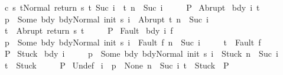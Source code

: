 \begin{isabellebody}
\ \ \ \ \ {\isasymGamma}{\isasymturnstile}{\isasymlangle}c\ s\ t{\isacharprime}{\isacharcomma}Normal\ {\isacharparenleft}return\ s\ t{\isacharprime}{\isacharparenright}{\isasymrangle}\ {\isacharequal}Suc\ i{\isasymRightarrow}\ \ t{\isacharsemicolon}\ n\ {\isacharequal}\ Suc\ i{\isasymrbrakk}\isanewline
\ \ \ \ {\isasymLongrightarrow}\ P{\isachardoublequoteclose}\isanewline
{}\ Abrupt{\isacharcolon}\isanewline
\ {\isachardoublequoteopen}{\isasymAnd}bdy\ i\ t{\isacharprime}{\isachardot}\isanewline
\ \ \ \ {\isasymlbrakk}{\isasymGamma}\ p\ {\isacharequal}\ Some\ bdy{\isacharsemicolon}\ {\isasymGamma}{\isasymturnstile}{\isasymlangle}bdy{\isacharcomma}Normal\ {\isacharparenleft}init\ s{\isacharparenright}{\isasymrangle}\ {\isacharequal}i{\isasymRightarrow}\ \ Abrupt\ t{\isacharprime}{\isacharsemicolon}\ n\ {\isacharequal}\ Suc\ i{\isacharsemicolon}\isanewline
\ \ \ \ \ t\ {\isacharequal}\ Abrupt\ {\isacharparenleft}return\ s\ t{\isacharprime}{\isacharparenright}{\isasymrbrakk}\isanewline
\ \ \ \ {\isasymLongrightarrow}\ P{\isachardoublequoteclose}\isanewline
{}\ Fault{\isacharcolon}\isanewline
\ {\isachardoublequoteopen}{\isasymAnd}bdy\ i\ f{\isachardot}\isanewline
\ \ \ \ {\isasymlbrakk}{\isasymGamma}\ p\ {\isacharequal}\ Some\ bdy{\isacharsemicolon}\ {\isasymGamma}{\isasymturnstile}{\isasymlangle}bdy{\isacharcomma}Normal\ {\isacharparenleft}init\ s{\isacharparenright}{\isasymrangle}\ {\isacharequal}i{\isasymRightarrow}\ \ Fault\ f{\isacharsemicolon}\ n\ {\isacharequal}\ Suc\ i{\isacharsemicolon}\isanewline
\ \ \ \ \ t\ {\isacharequal}\ Fault\ f{\isasymrbrakk}\isanewline
\ \ \ \ {\isasymLongrightarrow}\ P{\isachardoublequoteclose}\isanewline
{}\ Stuck{\isacharcolon}\isanewline
\ {\isachardoublequoteopen}{\isasymAnd}bdy\ i{\isachardot}\isanewline
\ \ \ \ {\isasymlbrakk}{\isasymGamma}\ p\ {\isacharequal}\ Some\ bdy{\isacharsemicolon}\ {\isasymGamma}{\isasymturnstile}{\isasymlangle}bdy{\isacharcomma}Normal\ {\isacharparenleft}init\ s{\isacharparenright}{\isasymrangle}\ {\isacharequal}i{\isasymRightarrow}\ \ Stuck{\isacharsemicolon}\ n\ {\isacharequal}\ Suc\ i{\isacharsemicolon}\isanewline
\ \ \ \ \ t\ {\isacharequal}\ Stuck{\isasymrbrakk}\isanewline
\ \ \ \ {\isasymLongrightarrow}\ P{\isachardoublequoteclose}\isanewline
{}\ Undef{\isacharcolon}\isanewline
\ {\isachardoublequoteopen}{\isasymAnd}i{\isachardot}\ {\isasymlbrakk}{\isasymGamma}\ p\ {\isacharequal}\ None{\isacharsemicolon}\ n\ {\isacharequal}\ Suc\ i{\isacharsemicolon}\ t\ {\isacharequal}\ Stuck{\isasymrbrakk}\ {\isasymLongrightarrow}\ P{\isachardoublequoteclose}\isanewline

\end{isabellebody}
